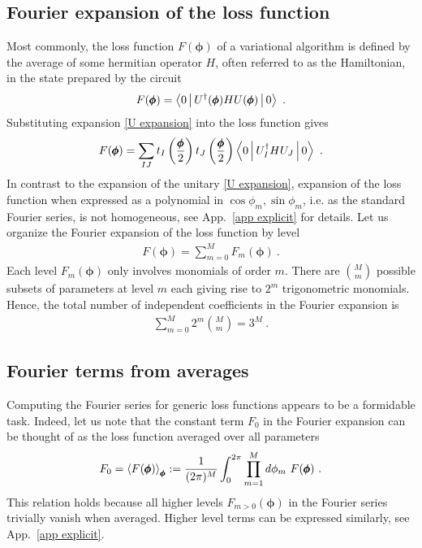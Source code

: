\documentclass[twocolumn, amsfonts, amssymb, aps, nofootinbib]{revtex4-2}
\begin{document}
\subsection{Fourier expansion of the loss function}
Most commonly, the loss function $F(\pmb\phi)$ of a variational algorithm is defined by the average of some hermitian operator $H$, often referred to as the Hamiltonian, in the state prepared by the circuit 
\begin{align}
	F(\pmb{\phi})=\Braket{0|U^\dagger(\pmb\phi)HU(\pmb\phi)|0} \ . \label{F def}
\end{align}
Substituting expansion \eqref{U expansion} into the loss function gives
\begin{align}
	F(\pmb{\phi})=\sum_{IJ}t_I\left(\frac{\pmb \phi}{2}\right)t_J\left(\frac{\pmb \phi}{2}\right)\Braket{0|U^\dagger_IHU_J|0} \ . \label{F exp}
\end{align}
In contrast to the expansion of the unitary \eqref{U expansion}, expansion of the loss function when expressed as a polynomial in $\cos\phi_m,\sin\phi_m$, i.e. as the standard Fourier series, is not homogeneous, see App.~\ref{app explicit} for details. Let us organize the Fourier expansion of the loss function by level
\begin{align}
	F(\pmb\phi)=\sum_{m=0}^M F_m(\pmb\phi) \ .
\end{align}
Each level $F_m(\pmb\phi)$ only involves monomials of order $m$.
There are $\binom{M}{m}$ possible subsets of parameters at level $m$ each giving rise to $2^m$ trigonometric monomials. Hence, the total number of independent coefficients in the Fourier expansion is
\begin{align}
	\sum_{m=0}^M 2^{m}\binom{M}{m}=3^M \label{3M coeffs} \ .
\end{align}
\subsection{Fourier terms from averages}
Computing the Fourier series for generic loss functions appears to be a formidable task. Indeed, let us note that the constant term $F_0$ in the Fourier expansion can be thought of as the loss function averaged over all parameters
\begin{align}
	F_0=\Braket{F(\pmb\phi)}_{\pmb\phi}:=\frac{1}{(2\pi)^M}\int_0^{2\pi}\prod_{m=1}^Md\phi_m\,\, F(\pmb\phi) \ . \label{F avg}
\end{align}
This relation holds because all higher levels $F_{m>0}(\pmb\phi)$ in the Fourier series trivially vanish when averaged. Higher level terms can be expressed similarly, see App.~\ref{app explicit}.
\end{document}
